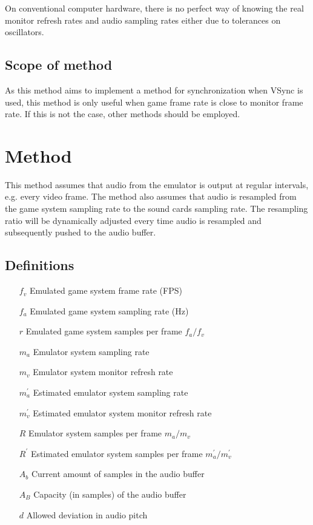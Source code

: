 \documentclass[11pt, a4paper]{article}
\begin{document}
On conventional computer hardware, there is no perfect way of knowing
the real monitor refresh rates and audio sampling rates either due to
tolerances on oscillators.

\subsection{Scope of method}
As this method aims to implement a method for synchronization when VSync is used,
this method is only useful when game frame rate is close to monitor frame rate.
If this is not the case, other methods should be employed.

\section{Method}
This method assumes that audio from the emulator is output at regular intervals, e.g.
every video frame. The method also assumes that audio is resampled from
the game system sampling rate to the sound cards sampling rate.
The resampling ratio will be dynamically adjusted every time audio is resampled and subsequently pushed to the audio buffer.

\subsection{Definitions}
\begin{itemize}
\item[$f_v$] Emulated game system frame rate (FPS)
\item[$f_a$] Emulated game system sampling rate (Hz)
\item[$r$] Emulated game system samples per frame $f_a / f_v$
\item[$m_a$] Emulator system sampling rate
\item[$m_v$] Emulator system monitor refresh rate
\item[$m_a^{'}$] Estimated emulator system sampling rate
\item[$m_v^{'}$] Estimated emulator system monitor refresh rate
\item[$R$] Emulator system samples per frame $m_a / m_v$
\item[$R^{'}$] Estimated emulator system samples per frame $m_a^{'} / m_v^{'}$
\item[$A_b$] Current amount of samples in the audio buffer
\item[$A_B$] Capacity (in samples) of the audio buffer
\item[$d$] Allowed deviation in audio pitch
\end{itemize}
\end{document}
